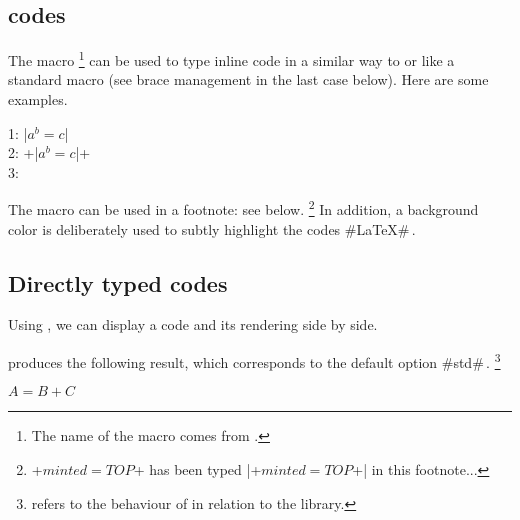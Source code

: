 \subsection{ codes}
\label{tutodoc-listing-inline}

The  macro
\footnote{
    The name of the macro  comes from .
}
can be used to type inline code in a similar way to  or like a standard macro (see brace management in the last case below).
Here are some examples.


\begin{tdoclatex}[sbs]
    1: \tdocinlatex|$a^b = c$|               \\
    2: \tdocinlatex+\tdocinlatex|$a^b = c$|+ \\
    3: 
\end{tdoclatex}


\begin{tdocnote}
    The  macro can be used in a footnote: see below.
    \footnote{
        \tdocinlatex+$minted = TOP$+ has been typed \tdocinlatex|\tdocinlatex+$minted = TOP$+| in this footnote...
    }
    In addition, a background color is deliberately used to subtly highlight the codes \tdocinlatex#\LaTeX#\,.
\end{tdocnote}




\subsection{Directly typed codes}

\begin{tdocexa}
    Using , we can display a code and its rendering side by side.

\end{tdocexa}




\begin{tdocexa}[Following]
     produces the following result, which corresponds to the default option \tdocinlatex#std#\,.
    \footnote{
         refers to the  behaviour of  in relation to the  library.
    }

    \begin{tdoclatex}
        $A = B + C$
    \end{tdoclatex}
\end{tdocexa}


